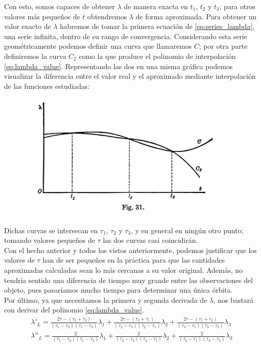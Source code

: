 \documentclass[11pt]{article}
\begin{document}
Con esto, somos capaces de obtener $\lambda$ de manera exacta en $t_1$, $t_2$ y $t_3$; para otros valores más pequeños de $t$ obtendremos $\lambda$ de forma aproximada. Para obtener un valor exacto de $\lambda$ habremos de tomar la primera ecuación de \eqref{eq:series_lambda}, una serie infinita, dentro de su rango de convergencia. Considerando esta serie geométricamente podemos definir una curva que llamaremos $C$; por otra parte definiremos la curva $C_2$ como la que produce el polinomio de interpolación \eqref{eq:lambda_value}. Representando las dos en una misma gráfica podemos visualizar la diferencia entre el valor real y el aproximado mediante interpolación de las funciones estudiadas:
\begin{figure}[H]
\centering
\includegraphics[scale=0.5]{images/fig_31.png}
\end{figure}

Dichas curvas se intersecan en $\tau_1$, $\tau_2$ y $\tau_3$, y en general en ningún otro punto; tomando valores pequeños de $\tau$ las dos curvas casi coincidirán.\\

Con el hecho anterior y todos los vistos anteriormente, podemos justificar que los valores de $\tau$ han de ser pequeños en la práctica para que las cantidades aproximadas calculadas sean lo más cercanas a su valor original. Además, no tendría sentido una diferencia de tiempo muy grande entre las observaciones del objeto, pues pasaríamos mucho tiempo para determinar una única órbita.\\

Por último, ya que necesitamos la primera y segunda derivada de $\lambda$, nos bastará con derivar del polinomio \eqref{eq:lambda_value}.
\begin{align*}
\lambda'_L = \frac{2\tau-(\tau_2+\tau_3)}{(\tau_1-\tau_2)(\tau_1-\tau_3)}\lambda_1
+\frac{2\tau-(\tau_3+\tau_1)}{(\tau_2-\tau_3)(\tau_2-\tau_1)}\lambda_2
+\frac{2\tau-(\tau_1+\tau_2)}{(\tau_3-\tau_1)(\tau_3-\tau_2)}\lambda_3\\
\lambda''_L = \frac{2}{(\tau_1-\tau_2)(\tau_1-\tau_3)}\lambda_1
+\frac{2}{(\tau_2-\tau_3)(\tau_2-\tau_1)}\lambda_2
+\frac{2}{(\tau_3-\tau_1)(\tau_3-\tau_2)}\lambda_3
\end{align*}
\end{document}
